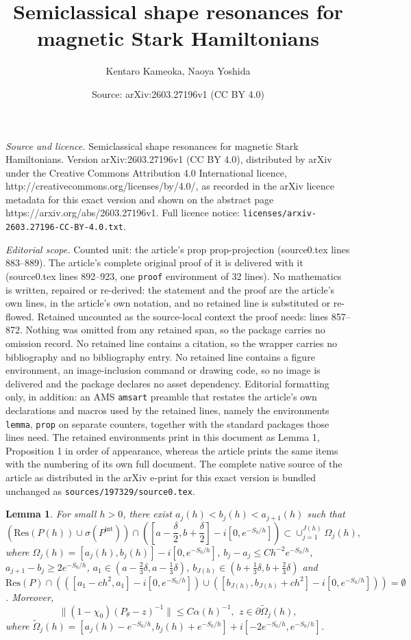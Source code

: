 \documentclass[10pt,a4paper]{amsart}
\title{Semiclassical shape resonances for magnetic Stark Hamiltonians}
\author{Kentaro Kameoka, Naoya Yoshida}
\date{Source: arXiv:2603.27196v1 (CC BY 4.0)}
\newtheorem{lemma}{Lemma}
\begin{document}
\maketitle

\noindent\emph{Source and licence.} Semiclassical shape resonances for magnetic Stark Hamiltonians. Version arXiv:2603.27196v1 (CC BY 4.0), distributed by arXiv under the Creative Commons Attribution 4.0 International licence, http://creativecommons.org/licenses/by/4.0/, as recorded in the arXiv licence metadata for this exact version and shown on the abstract page https://arxiv.org/abs/2603.27196v1. Full licence notice: \texttt{licenses/arxiv-2603.27196-CC-BY-4.0.txt}.\par\smallskip

\noindent\textit{Editorial scope.} Counted unit: the article's prop prop-projection (source0.tex lines 883--889). The article's complete original proof of it is delivered with it (source0.tex lines 892--923, one \texttt{proof} environment of 32 lines). No mathematics is written, repaired or re-derived: the statement and the proof are the article's own lines, in the article's own notation, and no retained line is substituted or re-flowed.  Retained uncounted as the source-local context the proof needs: lines 857--872.  Nothing was omitted from any retained span, so the package carries no omission record.  No retained line contains a citation, so the wrapper carries no bibliography and no bibliography entry.  No retained line contains a figure environment, an image-inclusion command or drawing code, so no image is delivered and the package declares no asset dependency.  Editorial formatting only, in addition: an AMS \texttt{amsart} preamble that restates the article's own declarations and macros used by the retained lines, namely the environments \texttt{lemma}, \texttt{prop} on separate counters, together with the standard packages those lines need.  The retained environments print in this document as Lemma 1, Proposition 1 in order of appearance, whereas the article prints the same items with the numbering of its own full document.  The complete native source of the article as distributed in the arXiv e-print for this exact version is bundled unchanged as \texttt{sources/197329/source0.tex}.
\begin{lemma}\label{lemma-cluster}
For small $h>0$, there exist $a_j(h)<b_j(h)<a_{j+1}(h)$ such that 
\[\left(\mathrm{Res}(P(h))\cup 
\sigma(P^{\mathrm{int}})\right)\cap ([a-\frac{\delta}{2}, b+\frac{\delta}{2}]-i[0, e^{-S_0/h}])
\subset \cup_{j=1}^{J(h)}\Omega_j(h),\]
where $\Omega_j(h)=[a_j(h), b_j(h)]-i[0, e^{-S_0/h}]$, 
$b_j-a_j\le Ch^{-2}e^{-S_0/h}$, $a_{j+1}-b_j\ge 2e^{-S_0/h}$, 
$a_1\in(a-\frac{2}{3}\delta, a-\frac{1}{3}\delta)$, $b_{J(h)}\in (b+\frac{1}{3}\delta,b+\frac{2}{3}\delta)$ and 
$\mathrm{Res}(P)\cap(([a_1-ch^2, a_1]-i[0, e^{-S_0/h}])
\cup ([b_{J(h)}, b_{J(h)}+ch^2]-i[0, e^{-S_0/h}]))
=\emptyset$.
Moreover, 
\[\|(1-\chi_0)(P_{\theta}-z)^{-1}\|\le C\alpha(h)^{-1},\mspace{7mu} z\in \partial \widetilde{\Omega}_j(h),\]
where $\widetilde{\Omega}_j(h)=[a_j(h)-e^{-S_0/h}, 
b_j(h)+e^{-S_0/h}]+i[-2e^{-S_0/h}, e^{-S_0/h}]$.
\end{lemma}
\end{document}
